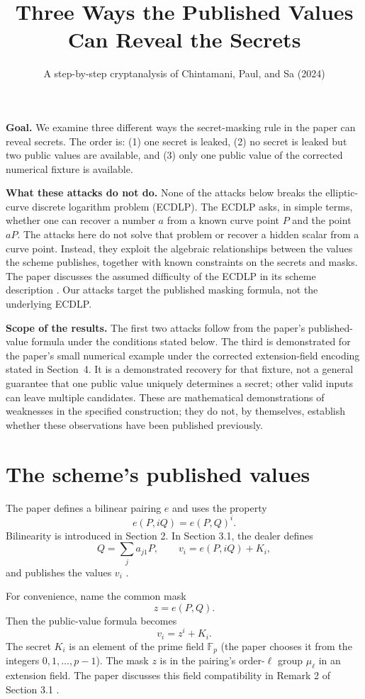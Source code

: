 \documentclass[11pt]{article}
\title{Three Ways the Published Values Can Reveal the Secrets}
\author{A step-by-step cryptanalysis of Chintamani, Paul, and Sa (2024)}
\date{}
\begin{document}
\maketitle

\noindent
\textbf{Goal.} We examine three different ways the secret-masking rule
in the paper can reveal secrets. The order is: (1) one secret is leaked,
(2) no secret is leaked but two public values are available, and
(3) only one public value of the corrected numerical fixture is available.

\medskip
\noindent
\textbf{What these attacks do not do.} None of the attacks below breaks
the elliptic-curve discrete logarithm problem (ECDLP). The ECDLP asks,
in simple terms, whether one can recover a number $a$ from a known curve
point $P$ and the point $aP$. The attacks here do not solve that problem
or recover a hidden scalar from a curve point. Instead, they exploit the
algebraic relationships between the values the scheme publishes, together
with known constraints on the secrets and masks. The paper discusses the
assumed difficulty of the ECDLP in its scheme description
\cite[Sec.~3.1, p.~1459]{chintamani2024}. Our attacks target the published
masking formula, not the underlying ECDLP.

\medskip
\noindent
\textbf{Scope of the results.} The first two attacks follow from the
paper's published-value formula under the conditions stated below.
The third is demonstrated for the paper's small numerical example under
the corrected extension-field encoding stated in Section~4.
It is a demonstrated recovery for that fixture, not a general guarantee
that one public value uniquely determines a secret; other valid inputs
can leave multiple candidates.
These are mathematical demonstrations of weaknesses in the specified
construction; they do not, by themselves, establish whether these
observations have been published previously.

\section{The scheme's published values}

The paper defines a bilinear pairing $e$ and uses the property
\[
    e(P,iQ)=e(P,Q)^i.
\]
Bilinearity is introduced in Section 2. In Section 3.1, the dealer defines
\[
    Q=\sum_j a_{j1}P,
    \qquad
    v_i=e(P,iQ)+K_i,
\]
and publishes the values $v_i$ \cite[Secs.~2 and~3.1, p.~1459]{chintamani2024}.

For convenience, name the common mask
\[
    z=e(P,Q).
\]
Then the public-value formula becomes
\begin{equation}
    \boxed{v_i=z^i+K_i.}
    \label{eq:public-values}
\end{equation}
The secret $K_i$ is an element of the prime field $\mathbb F_p$ (the paper chooses it from the integers $0,1,\ldots,p-1$). The mask $z$ is in the pairing's order-$\ell$ group $\mu_\ell$ in an extension field. The paper discusses this field compatibility in Remark 2 of Section 3.1 \cite{chintamani2024}.
\end{document}
